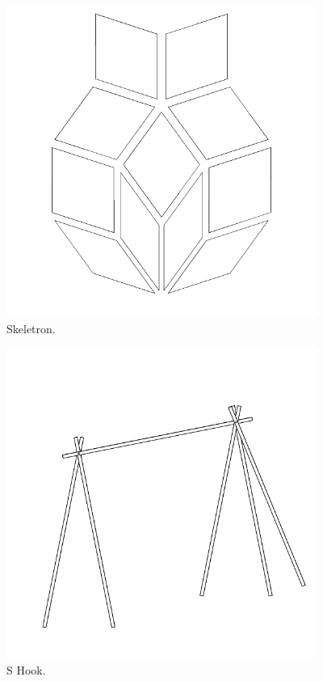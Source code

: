 \begin{figure}
	\centering
	\includegraphics[width=4in]{imageserver/uploadimages/image8.png}
	\caption{Skeletron.}
\end{figure}

\begin{figure}
	\centering
	\includegraphics[width=4in]{imageserver/uploadimages/image9.png}
	\caption{S Hook.}
\end{figure}

